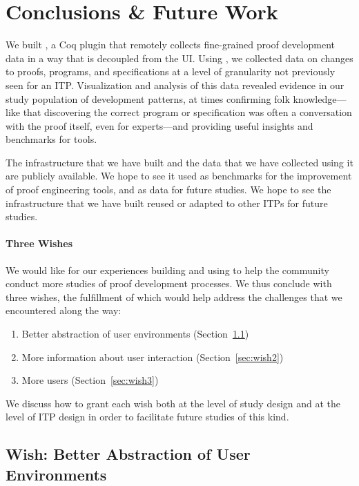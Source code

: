 \section{Conclusions \& Future Work}
\label{sec:discussion}

We built \toolname, a Coq plugin that remotely collects fine-grained
proof development data in a way that is decoupled from the UI.
Using \toolname, we collected data on changes to proofs, programs,
and specifications at a level of granularity not previously
seen for an ITP.
Visualization and analysis of this data revealed evidence in our study
population of development patterns, at times confirming folk knowledge---like 
that discovering  the correct program or specification was often a
conversation with the proof itself, even for experts---and providing
useful insights and benchmarks for tools.

The infrastructure that we have built and the data that we have collected
using it are publicly available.
We hope to see it used as benchmarks for the improvement of
proof engineering tools, and as data for future studies.
We hope to see the infrastructure that we have built reused or
adapted to other ITPs for future studies.

\paragraph{Three Wishes}
We would like for our experiences building and using \toolname
to help the community conduct more studies of proof development processes.
We thus conclude with three wishes, the fulfillment of which would help
address the challenges that we encountered along the way:

\begin{enumerate}
\item Better abstraction of user environments (Section~\ref{sec:wish1})
\item More information about user interaction (Section~\ref{sec:wish2})
\item More users (Section~\ref{sec:wish3})
\end{enumerate}
We discuss how to grant each wish both at the level of study design
and at the level of ITP design in order to facilitate future studies of 
this kind.

\subsection{Wish: Better Abstraction of User Environments}
\label{sec:wish1}

